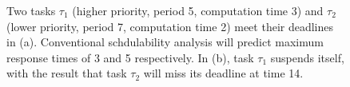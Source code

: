 \begin{figure}[t]
{{}}
\caption{
Two tasks $\tau_1$ (higher priority, period 5, computation time 3) and $\tau_2$ (lower priority, period 7, computation time 2) meet their deadlines in (a). Conventional schdulability analysis will predict maximum response times of 3 and 5 respectively. In (b), task $\tau_1$ suspends itself, with the result that task $\tau_2$ will miss its deadline at time 14.}
\label{fig:ss-intuition}
\end{figure}








